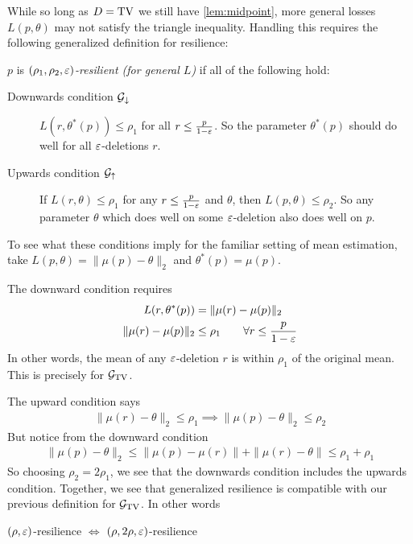 While so long as $D = \operatorname{TV}$ we still have \cref{lem:midpoint},
more general losses $L(p, \theta)$ may not satisfy the triangle inequality.
Handling this requires the following generalized definition for resilience:

\begin{definition}\label{def:resilience-general}
  $p$ is \emph{$(\rho_1, \rho_2, \varepsilon)$-resilient (for general $L$)} if
  all of the following hold:
  \begin{description}
    \item[Downwards condition $\mathcal{G}_\downarrow$]
      $L(r, \theta^*(p)) \leq \rho_1$ for all $r \leq \frac{p}{1-\varepsilon}$.
      So the parameter $\theta^*(p)$ should do well for all $\varepsilon$-deletions $r$.
    \item[Upwards condition $\mathcal{G}_\uparrow$]
      If $L(r, \theta) \leq \rho_1$ for any $r \leq \frac{p}{1-\varepsilon}$
      and $\theta$, then $L(p, \theta) \leq \rho_2$. So any parameter $\theta$
      which does well on some $\varepsilon$-deletion also does well on $p$.
  \end{description}
\end{definition}

\begin{example}
  To see what these conditions imply for the familiar setting of mean
  estimation, take $L(p, \theta) = \|\mu(p) - \theta\|_2$ and
  $\theta^*(p) = \mu(p)$.

  The downward condition requires
  \begin{align}
    L(r, \theta^*(p)) &= \|\mu(r) - \mu(p)\|_2 \\
    \|\mu(r) - \mu(p)\|_2 &\leq \rho_1 \qquad \forall r \leq \frac{p}{1-\varepsilon}
  \end{align}
  In other words, the mean of any $\varepsilon$-deletion $r$ is within $\rho_1$
  of the original mean. This is precisely 
  for $\mathcal{G}_{\operatorname{TV}}$.

  The upward condition says
  \begin{align}
      \|\mu(r) - \theta\|_2 \leq \rho_1 \implies
      \|\mu(p) - \theta\|_2 \leq \rho_2
  \end{align}
  But notice from the downward condition
  \begin{align}
    \|\mu(p) - \theta\|_2
    \leq \|\mu(p) - \mu(r)\| + \|\mu(r) - \theta\|
    \leq \rho_1 + \rho_1
  \end{align}
  So choosing $\rho_2 = 2 \rho_1$, we see that the downwards condition includes
  the upwards condition.
  Together, we see that generalized resilience is compatible with
  our previous definition for $\mathcal{G}_{\operatorname{TV}}$. In other words
  \begin{center}
    $(\rho,\varepsilon)$-resilience $\iff$ $(\rho, 2\rho, \varepsilon)$-resilience \end{center}
\end{example}

